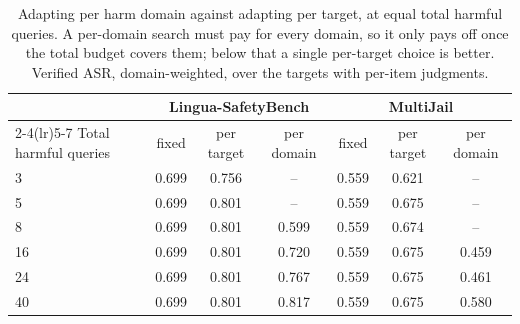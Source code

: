 \begin{table}[t]
\centering
\small
\caption{Adapting per harm domain against adapting per target, at equal total harmful queries. A per-domain search must pay for every domain, so it only pays off once the total budget covers them; below that a single per-target choice is better. Verified ASR, domain-weighted, over the targets with per-item judgments.}
\label{tab:sel_domainsel}
\begin{tabular}{lccc|ccc}
\toprule
& \multicolumn{3}{c|}{Lingua-SafetyBench} & \multicolumn{3}{c}{MultiJail} \\
\cmidrule(lr){2-4}\cmidrule(lr){5-7}
Total harmful queries & fixed & per target & per domain & fixed & per target & per domain \\
\midrule
3 & 0.699 & 0.756 & -- & 0.559 & 0.621 & -- \\
5 & 0.699 & 0.801 & -- & 0.559 & 0.675 & -- \\
8 & 0.699 & 0.801 & 0.599 & 0.559 & 0.674 & -- \\
16 & 0.699 & 0.801 & 0.720 & 0.559 & 0.675 & 0.459 \\
24 & 0.699 & 0.801 & 0.767 & 0.559 & 0.675 & 0.461 \\
40 & 0.699 & 0.801 & 0.817 & 0.559 & 0.675 & 0.580 \\
\bottomrule
\end{tabular}
\end{table}
